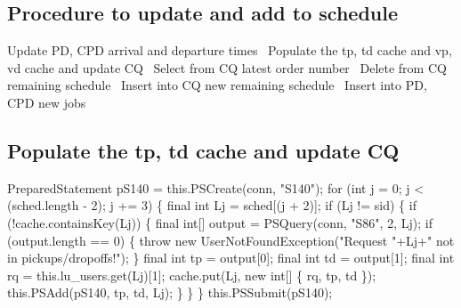 \subsection{Procedure to update and add to schedule}
\nwenddocs{}\endmoddef{}
\LA{}Update PD, CPD arrival and departure times~{\nwtagstyle{}}\RA{}
\LA{}Populate the tp, td cache and vp, vd cache and update CQ~{\nwtagstyle{}}\RA{}
\LA{}Select from CQ latest order number~{\nwtagstyle{}}\RA{}
\LA{}Delete from CQ remaining schedule~{\nwtagstyle{}}\RA{}
\LA{}Insert into CQ new remaining schedule~{\nwtagstyle{}}\RA{}
\LA{}Insert into PD, CPD new jobs~{\nwtagstyle{}}\RA{}
\nwendcode{}\nwdocspar

\subsection{Populate the tp, td cache and update CQ}
\nwenddocs{}\endmoddef{}
PreparedStatement pS140 = this.PSCreate(conn, "S140");
for (int j = 0; j < (sched.length - 2); j += 3) \{
  final int Lj = sched[(j + 2)];
  if (Lj != sid) \{
    if (!cache.containsKey(Lj)) \{
      final int[] output = PSQuery(conn, "S86", 2, Lj);
      if (output.length == 0) \{
        throw new UserNotFoundException("Request "+Lj+" not in pickups/dropoffs!");
      \}
      final int tp = output[0];
      final int td = output[1];
      final int rq = this.lu_users.get(Lj)[1];
      cache.put(Lj, new int[] \{ rq, tp, td \});
      this.PSAdd(pS140, tp, td, Lj);
    \}
  \}
\}
this.PSSubmit(pS140);
\nwendcode{}\nwdocspar

